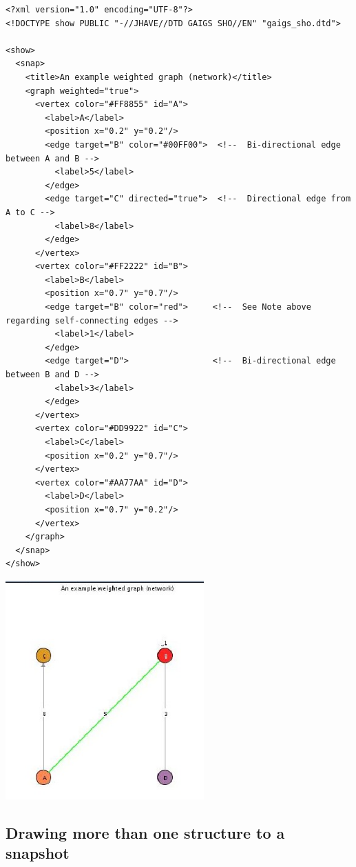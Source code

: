 \documentclass[11pt,letterpaper]{book}
\begin{document}
\footnotesize \begin{verbatim}
<?xml version="1.0" encoding="UTF-8"?>
<!DOCTYPE show PUBLIC "-//JHAVE//DTD GAIGS SHO//EN" "gaigs_sho.dtd">

<show>
  <snap>
    <title>An example weighted graph (network)</title>
    <graph weighted="true">
      <vertex color="#FF8855" id="A">
        <label>A</label>
        <position x="0.2" y="0.2"/>
        <edge target="B" color="#00FF00">  <!--  Bi-directional edge between A and B -->
          <label>5</label>
        </edge>
        <edge target="C" directed="true">  <!--  Directional edge from A to C -->
          <label>8</label>
        </edge>
      </vertex>
      <vertex color="#FF2222" id="B">
        <label>B</label>
        <position x="0.7" y="0.7"/>
        <edge target="B" color="red">     <!--  See Note above regarding self-connecting edges -->
          <label>1</label>
        </edge>
        <edge target="D">                 <!--  Bi-directional edge between B and D -->
          <label>3</label>
        </edge>
      </vertex>
      <vertex color="#DD9922" id="C">
        <label>C</label>
        <position x="0.2" y="0.7"/>
      </vertex>
      <vertex color="#AA77AA" id="D">
        <label>D</label>
        <position x="0.7" y="0.2"/>
      </vertex>
    </graph>
  </snap>
</show>
\end{verbatim} \normalsize



\begin{center}
  \includegraphics[width=3in]{howto_graphics/graph.eps}
\end{center}


\subsection{Drawing more than one structure to a snapshot}
\end{document}
